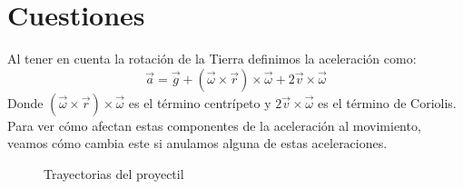 \documentclass{article}
\begin{document}
\section{Cuestiones}
Al tener en cuenta la rotación de la Tierra definimos la aceleración como:
\begin{equation}
\vec{a} = \vec{g} + (\vec{\omega}\times\vec{r})\times\vec{\omega} +2\vec{v}\times\vec{\omega}
\end{equation}
Donde $(\vec{\omega}\times\vec{r})\times\vec{\omega}$ es el término centrípeto y $2\vec{v}\times\vec{\omega}$ es el término de Coriolis.\newline\linebreak
Para ver cómo afectan estas componentes de la aceleración al movimiento, veamos cómo cambia este si anulamos alguna de estas aceleraciones.
\begin{figure}[H]
 \centering
 \caption{Trayectorias del proyectil}
\label{fig1}
\end{figure}
\end{document}

